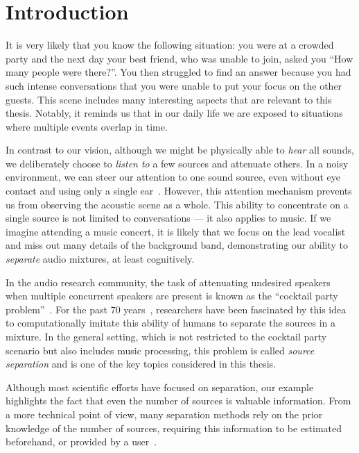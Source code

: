 \chapter{Introduction}\label{ch:introduction}

It is very likely that you know the following situation: you were at a crowded party and the next day your best friend, who was unable to join, asked you ``How many people were there?''.
You then struggled to find an answer because you had such intense conversations that you were unable to put your focus on the other guests.
This scene includes many interesting aspects that are relevant to this thesis. Notably, it reminds us that in our daily life we are exposed to situations where multiple events overlap in time.
\par
In contrast to our vision, although we might be physically able to \emph{hear} all sounds, we deliberately choose to \emph{listen to} a few sources and attenuate others.
In a noisy environment, we can steer our attention to one sound source, even without eye contact and using only a single ear~\cite{bregman90}.
However, this attention mechanism prevents us from observing the acoustic scene as a whole.
This ability to concentrate on a single source is not limited to conversations --- it also applies to music.
If we imagine attending a music concert, it is likely that we focus on the lead vocalist and miss out many details of the background band, demonstrating our ability to \emph{separate} audio mixtures, at least cognitively.
\par
In the audio research community, the task of attenuating undesired speakers when multiple concurrent speakers are present is known as the ``cocktail party problem''~\cite{haykin05}.
For the past 70 years~\cite{cherry53}, researchers have been fascinated by this idea to computationally imitate this ability of humans to separate the sources in a mixture.
In the general setting, which is not restricted to the cocktail party scenario but also includes music processing, this problem is called \emph{source separation} and is one of the key topics considered in this thesis.
\par
Although most scientific efforts have focused on separation, our example highlights the fact that even the number of sources is valuable information.
From a more technical point of view, many separation methods rely on the prior knowledge of the number of sources, requiring this information to be estimated beforehand, or provided by a user~\cite{liutkus13}.
